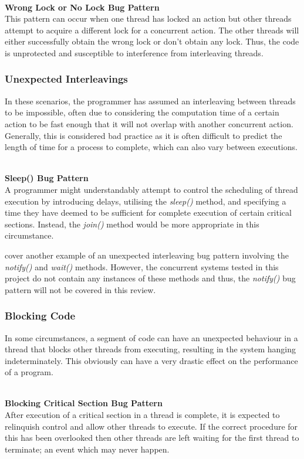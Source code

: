 \documentclass[a4paper,12pt]{article}
\begin{document}
\textbf{\\Wrong Lock or No Lock Bug Pattern}
\\This pattern can occur when one thread has locked an action but other threads attempt to acquire a different lock for a concurrent action. The other threads will either successfully obtain the wrong lock or don’t obtain any lock. Thus, the code is unprotected and susceptible to interference from interleaving threads.


\subsubsection{Unexpected Interleavings}

In these scenarios, the programmer has assumed an interleaving between threads to be impossible, often due to considering the computation time of a certain action to be fast enough that it will not overlap with another concurrent action. Generally, this is considered bad practice as it is often difficult to predict the length of time for a process to complete, which can also vary between executions. 

\textbf{\\Sleep() Bug Pattern}
\\A programmer might understandably attempt to control the scheduling of thread execution by introducing delays, utilising the \textit{sleep()} method, and specifying a time they have deemed to be sufficient for complete execution of certain critical sections. Instead, the \textit{join()} method would be more appropriate in this circumstance.

\citet{farchi03} cover another example of an unexpected interleaving bug pattern involving the \textit{notify()} and \textit{wait()} methods. However, the concurrent systems tested in this project do not contain any instances of these methods and thus, the \textit{notify()} bug pattern will not be covered in this review.   


\subsubsection{Blocking Code} \label{section:Blocking Code}

In some circumstances, a segment of code can have an unexpected behaviour in a thread that blocks other threads from executing, resulting in the system hanging indeterminately. This obviously can have a very drastic effect on the performance of a program.

\textbf{\\Blocking Critical Section Bug Pattern}
\\After execution of a critical section in a thread is complete, it is expected to relinquish control and allow other threads to execute. If the correct procedure for this has been overlooked then other threads are left waiting for the first thread to terminate; an event which may never happen.   
\end{document}
